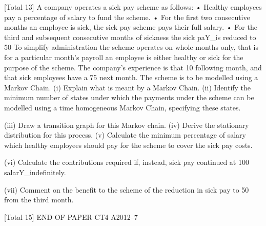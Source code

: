 
[Total 13]
A company operates a sick pay scheme as follows:
• Healthy employees pay a percentage of salary to fund the scheme.
• For the first two consecutive months an employee is sick, the sick pay scheme
pays their full salary.
• For the third and subsequent consecutive months of sickness the sick paY_is
reduced to 50%
To simplify administration the scheme operates on whole months only, that is for a
particular month’s payroll an employee is either healthy or sick for the purpose of the
scheme.
The company’s experience is that 10%
following month, and that sick employees have a 75%
next month.
The scheme is to be modelled using a Markov Chain.
(i) Explain what is meant by a Markov Chain. (ii) Identify the minimum number of states under which the payments under the
scheme can be modelled using a time homogeneous Markov Chain, specifying
these states.

(iii) Draw a transition graph for this Markov chain. 
(iv) Derive the stationary distribution for this process. 
(v) Calculate the minimum percentage of salary which healthy employees should
pay for the scheme to cover the sick pay costs.

(vi) Calculate the contributions required if, instead, sick pay continued at 100%
salarY_indefinitely.

(vii) Comment on the benefit to the scheme of the reduction in sick pay to 50%
from the third month.

[Total 15]
END OF PAPER
CT4 A2012–7

